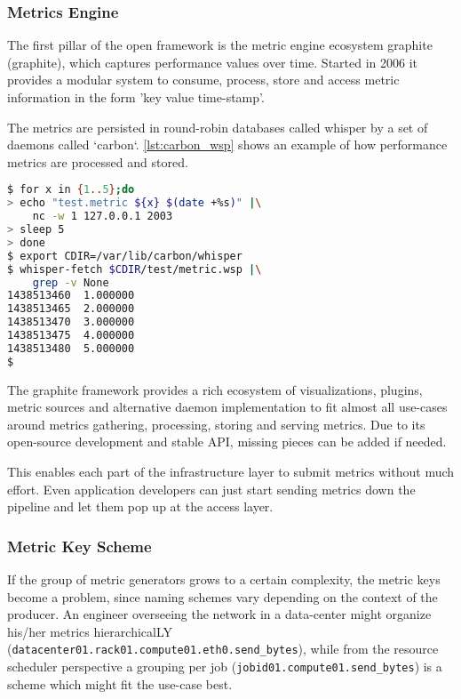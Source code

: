 \subsubsection{Metrics Engine}
\label{metricsengine}
The first pillar of the open framework is the metric engine ecosystem \gls{graphite} (\glsdesc{graphite}), which captures performance values over time. 
Started in 2006 it provides a modular system to consume, process, store and access metric information in the form 'key value time-stamp'.

The metrics are persisted in round-robin databases called whisper by a set of daemons called `carbon`.
\autoref{lst:carbon_wsp} shows an example of how performance metrics are processed and stored.

\begin{lstlisting}[language=bash,
    caption={Sending and receiving metrics using carbon in combination with a whisper file back-end.},
    label={lst:carbon_wsp}]
$ for x in {1..5};do
> echo "test.metric ${x} $(date +%s)" |\
    nc -w 1 127.0.0.1 2003
> sleep 5
> done
$ export CDIR=/var/lib/carbon/whisper
$ whisper-fetch $CDIR/test/metric.wsp |\
    grep -v None
1438513460	1.000000
1438513465	2.000000
1438513470	3.000000
1438513475	4.000000
1438513480	5.000000
$
\end{lstlisting}

The \gls{graphite} framework provides a rich ecosystem of visualizations, plugins, metric sources and alternative daemon implementation to fit almost
all use-cases around metrics gathering, processing, storing and serving metrics. Due to its open-source development and stable API, missing pieces
can be added if needed.

This enables each part of the infrastructure layer to submit metrics without much effort. Even application developers can just start sending metrics down the pipeline and
let them pop up at the access layer.

\subsubsection{Metric Key Scheme}

If the group of metric generators grows to a certain complexity, the metric keys become a problem, since naming schemes vary depending on the context of
the producer. An engineer overseeing the network in a data-center might organize his/her metrics hierarchicalLY (\lstinline{datacenter01.rack01.compute01.eth0.send_bytes}), while from the
resource scheduler perspective a grouping per job (\lstinline{jobid01.compute01.send_bytes}) is a scheme which might fit the use-case best.

